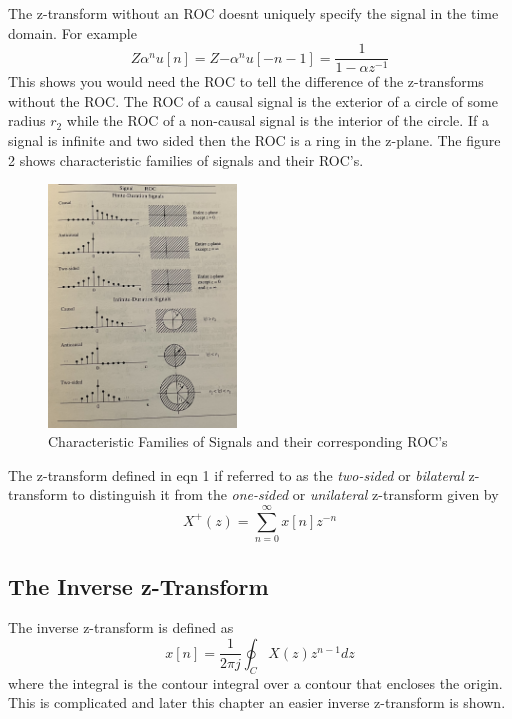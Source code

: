 \documentclass{article} %
\begin{document}
	The z-transform without an ROC doesnt uniquely specify the signal in the time domain. For example
	\begin{equation}
	Z{\alpha^nu[n]}  = Z{-\alpha^nu[-n-1]} = \frac{1}{1-\alpha z^{-1}}
	\end{equation}
	This shows you would need the ROC to tell the difference of the z-transforms without the ROC. The ROC of a causal signal is the exterior of a circle of some radius $r_2$ while the ROC of a non-causal signal is the interior of the circle. If a signal is infinite and two sided then the ROC is a ring in the z-plane. The figure 2 shows characteristic families of signals and their ROC's.
	
	\begin{figure}[h]
	\centering
	\includegraphics[width=5cm]{fam}
	\caption{Characteristic Families of Signals and their corresponding ROC's}
	\end{figure}
	
	The z-transform defined in eqn 1 if referred to as the \textit{two-sided} or \textit{bilateral} z-transform to distinguish it from the \textit{one-sided} or \textit{unilateral} z-transform given by
	\begin{equation}
	X^+(z) = \sum_{n=0}^{\infty}x[n]z^{-n}
	\end{equation}
	
	\subsection{The Inverse z-Transform}
	The inverse z-transform is defined as 
	\begin{equation}
	x[n] = \frac{1}{2\pi j} \oint_C X(z)z^{n-1}dz
	\end{equation}
	where the integral is the contour integral over a contour that encloses the origin. This is complicated and later this chapter an easier inverse z-transform is shown.
	
\end{document}
